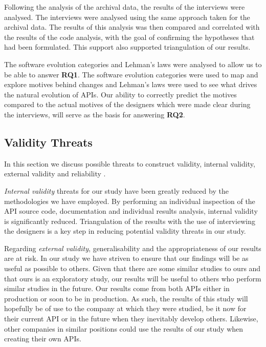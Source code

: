 \documentclass[conference]{IEEEtran}
\begin{document}
Following the analysis of the archival data, the results of the interviews were analysed. The interviews were analysed using the same approach taken for the archival data. The results of this analysis was then compared and correlated with the results of the code analysis, with the goal of confirming the hypotheses that had been formulated. This support also supported triangulation of our results. 

The software evolution categories \cite{chapin2001types} and Lehman's laws \cite{lehman1980programs} were analysed to allow us to be able to answer \textbf{RQ1}. The software evolution categories were used to map and explore motives behind changes and Lehman's laws were used to see what drives the natural evolution of APIs. Our ability to correctly predict the motives compared to the actual motives of the designers which were made clear during the interviews, will serve as the basis for answering \textbf{RQ2}.


\subsection{Validity Threats} \label{validity_threats}
In this section we discuss possible threats to construct validity, internal validity, external validity and reliability \cite{runeson2009guidelines}.


\textit{Internal validity} threats for our study have been greatly reduced by the methodologies we have employed. By performing an individual inspection of  the API source code, documentation and individual results analysis, internal validity is significantly reduced. Triangulation of the results with the use of interviewing the designers is a key step in reducing potential validity threats in our study.

Regarding \textit{external validity}, generalisability and the appropriateness of our results are at risk. In our study we have striven to ensure that our findings will be as useful as possible to others. Given that there are some similar studies to ours and that ours is an exploratory study, our results will be useful to others who perform similar studies in the future. Our results come from both APIs either in production or soon to be in production. As such, the results of this study will hopefully be of use to the company at which they were studied, be it now for their current API or in the future when they inevitably develop others. Likewise, other companies in similar positions could use the results of our study when creating their own APIs.
\end{document}
